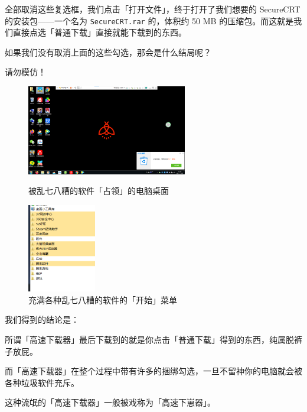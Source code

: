全部取消这些复选框，我们点击「打开文件」，终于打开了我们想要的 SecureCRT 的安装包——一个名为 \verb|SecureCRT.rar| 的，体积约 50 MB 的压缩包。而这就是我们直接点选「普通下载」直接就能下载到的东西。

如果我们没有取消上面的这些勾选，那会是什么结局呢？

\begin{warning}
  请勿模仿！
\end{warning}

\begin{figure}[H]
  \centering
  \begin{minipage}{8cm}
    \centering
    \includegraphics[width=7cm]{assets/Gao_su_4.png}
    \caption{被乱七八糟的软件「占领」的电脑桌面}
    \label{gao-su-downloader-4}
  \end{minipage}
  \qquad
  \begin{minipage}{4cm}
    \centering
    \includegraphics[width=3cm]{assets/Gao_su_5.png}
    \caption{充满各种乱七八糟的软件的「开始」菜单}
    \label{gao-su-downloader-5}
  \end{minipage} 
\end{figure}

我们得到的结论是：

所谓「高速下载器」最后下载到的就是你点击「普通下载」得到的东西，纯属脱裤子放屁。

而「高速下载器」在整个过程中带有许多的捆绑勾选，一旦不留神你的电脑就会被各种垃圾软件充斥。

\begin{note}
  这种流氓的「高速下载器」一般被戏称为「高速下崽器」。
\end{note}

\practice

